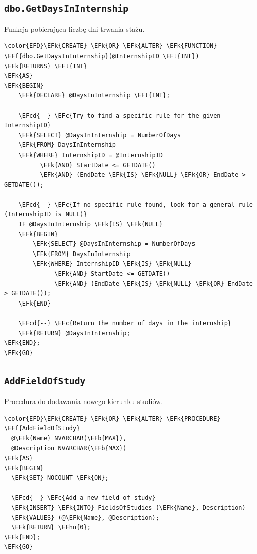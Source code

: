 \documentclass[11pt]{article}
\newcommand{\EFc}[1]{\textcolor{EFc}{\textit{#1}}} %
\newcommand{\EFcd}[1]{\textcolor{EFcd}{\textit{#1}}} %
\newcommand{\EFk}[1]{\textcolor{EFk}{\textbf{#1}}} %
\newcommand{\EFb}[1]{\textcolor{EFb}{\textbf{#1}}} %
\newcommand{\EFf}[1]{\textcolor{EFf}{#1}} %
\newcommand{\EFt}[1]{\textcolor{EFt}{\textbf{#1}}} %
\newcommand{\EFhn}[1]{\textcolor{EFhn}{#1}} %
\begin{document}
\subsection{\texttt{dbo.GetDaysInInternship}}
\label{sec:org813a76f}
Funkcja pobierająca liczbę dni trwania stażu.
\begin{Code}
\begin{Verbatim}
\color{EFD}\EFk{CREATE} \EFk{OR} \EFk{ALTER} \EFk{FUNCTION} \EFf{dbo.GetDaysInInternship}(@InternshipID \EFt{INT})
\EFk{RETURNS} \EFt{INT}
\EFk{AS}
\EFk{BEGIN}
    \EFk{DECLARE} @DaysInInternship \EFt{INT};

    \EFcd{--} \EFc{Try to find a specific rule for the given InternshipID}
    \EFk{SELECT} @DaysInInternship = NumberOfDays
    \EFk{FROM} DaysInInternship
    \EFk{WHERE} InternshipID = @InternshipID
          \EFk{AND} StartDate <= GETDATE()
          \EFk{AND} (EndDate \EFk{IS} \EFk{NULL} \EFk{OR} EndDate > GETDATE());

    \EFcd{--} \EFc{If no specific rule found, look for a general rule (InternshipID is NULL)}
    IF @DaysInInternship \EFk{IS} \EFk{NULL}
    \EFk{BEGIN}
        \EFk{SELECT} @DaysInInternship = NumberOfDays
        \EFk{FROM} DaysInInternship
        \EFk{WHERE} InternshipID \EFk{IS} \EFk{NULL}
              \EFk{AND} StartDate <= GETDATE()
              \EFk{AND} (EndDate \EFk{IS} \EFk{NULL} \EFk{OR} EndDate > GETDATE());
    \EFk{END}

    \EFcd{--} \EFc{Return the number of days in the internship}
    \EFk{RETURN} @DaysInInternship;
\EFk{END};
\EFk{GO}
\end{Verbatim}
\end{Code}
\subsection{\texttt{AddFieldOfStudy}}
\label{sec:orgd4e4e53}
Procedura do dodawania nowego kierunku studiów.
\begin{Code}
\begin{Verbatim}
\color{EFD}\EFk{CREATE} \EFk{OR} \EFk{ALTER} \EFk{PROCEDURE} \EFf{AddFieldOfStudy}
  @\EFk{Name} NVARCHAR(\EFb{MAX}),
  @Description NVARCHAR(\EFb{MAX})
\EFk{AS}
\EFk{BEGIN}
  \EFk{SET} NOCOUNT \EFk{ON};

  \EFcd{--} \EFc{Add a new field of study}
  \EFk{INSERT} \EFk{INTO} FieldsOfStudies (\EFk{Name}, Description)
  \EFk{VALUES} (@\EFk{Name}, @Description);
  \EFk{RETURN} \EFhn{0};
\EFk{END};
\EFk{GO}
\end{Verbatim}
\end{Code}
\end{document}
